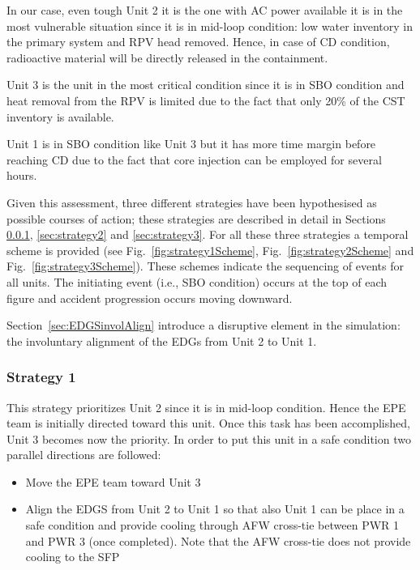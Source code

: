 In our case, even tough Unit 2 it is the one with AC power available it is in the most vulnerable situation since it 
is in mid-loop condition: low water inventory in the primary system and RPV head removed. Hence, in case of
CD condition, radioactive material will be directly released in the containment.

Unit 3 is the unit in the most critical condition since it is in SBO condition and heat removal from the RPV is limited
due to the fact that only 20\% of the CST inventory is available.

Unit 1 is in SBO condition like Unit 3 but it has more time margin before reaching CD due to the fact that core injection 
can be employed for several hours.

Given this assessment, three different strategies have been hypothesised as possible courses of action; these strategies
are described in detail in Sections \ref{sec:strategy1}, \ref{sec:strategy2} and \ref{sec:strategy3}.
For all these three strategies a temporal scheme is provided (see Fig.~\ref{fig:strategy1Scheme}, 
Fig.~\ref{fig:strategy2Scheme} and Fig.~\ref{fig:strategy3Scheme}). These schemes indicate the sequencing of events 
for all units. The initiating event (i.e., SBO condition) occurs at the top of each figure and accident progression 
occurs moving downward.

Section~\ref{sec:EDGSinvolAlign} introduce a disruptive element in the simulation: the involuntary alignment of the EDGs
from Unit 2 to Unit 1.


\subsubsection{Strategy 1}
\label{sec:strategy1}
This strategy prioritizes Unit 2 since it is in mid-loop condition. Hence the EPE team is initially directed toward
this unit. 
Once this task has been accomplished, Unit 3 becomes now the priority. In order to put this unit in a safe 
condition two parallel directions are followed:

\begin{itemize}
  \item Move the EPE team toward Unit 3 
  \item Align the EDGS from Unit 2 to Unit 1 so that also Unit 1 can be place in a safe condition and provide cooling 
        through AFW cross-tie between PWR 1 and PWR 3 (once completed). Note that the AFW cross-tie does not provide 
        cooling to the SFP
\end{itemize}

